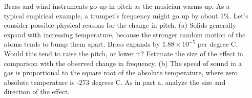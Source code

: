 Brass and wind instruments go up in pitch as the musician
warms up. As a typical empirical example, a trumpet's frequency might go
up by about 1\%. Let's consider possible physical reasons for the
change in pitch. (a) Solids generally expand with increasing
temperature, because the stronger random motion of the atoms
tends to bump them apart. Brass expands by $1.88\times10^{-5}$
 per degree C. Would this tend to raise the pitch, or
lower it? Estimate the size of the effect in comparison with
the observed change in frequency. (b) The speed of sound in
a gas is proportional to the square root of the absolute
temperature, where zero absolute temperature is -273 degrees
C. As in part a, analyze the size and direction of the
effect.
